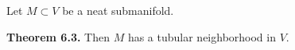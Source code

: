 Let $M \subset V$ be a neat submanifold.

\textbf{Theorem 6.3.} Then $M$ has a tubular neighborhood in $V$.

